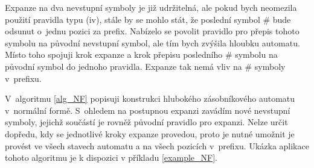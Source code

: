 Expanze na dva nevstupní symboly je již udržitelná, ale pokud bych neomezila použití pravidla typu (iv), stále by se mohlo stát, že poslední symbol $\#$ bude odsunut o~jednu pozici za prefix. Nabízelo se povolit pravidlo pro přepis tohoto symbolu na původní nevstupní symbol, ale tím bych zvýšila hloubku automatu. Místo toho spojuji krok expanze a krok přepisu posledního $\#$ symbolu na původní symbol do jednoho pravidla. Expanze tak nemá vliv na $\#$ symboly v~prefixu.

V~algoritmu \ref{alg_NF} popisuji konstrukci hlubokého zásobníkového automatu v~normální formě. S~ohledem na postupnou expanzi zavádím nové nevstupní symboly, jejichž součástí je rovněž původní pravidlo pro expanzi. Nelze určit dopředu, kdy se jednotlivé kroky expanze provedou, proto je nutné umožnit je provést ve všech stavech automatu a na všech pozicích v~prefixu. 
Ukázka aplikace tohoto algoritmu je k dispozici v příkladu \ref{example_NF}.

